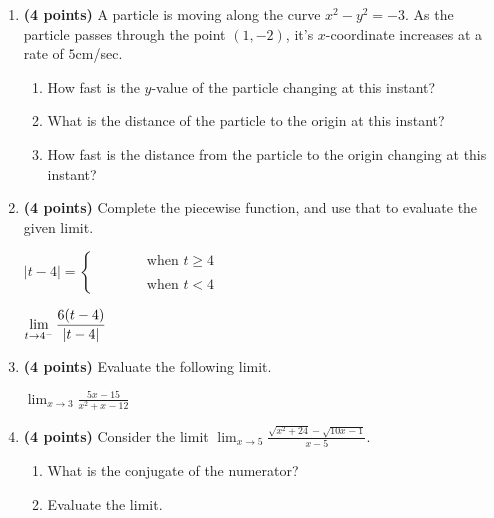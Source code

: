 \documentclass[12pt]{amsart}
\begin{document}
\begin{enumerate}
\vspace{2cm}
\newpage\def \b{1}\def \x{1}\def \y{-2}\def \xchange{5}\def \ratrhs{-2}\def \cirrhs{5}\def \hyprhs{-3}\def \compy{y^{2}}\def \ychangenum{-10}\def \dist{5}\def \fracrat{-30}\def \fraccirc{0}\def \frachyp{20}
\item {\bf (4 points)} 
 A particle is moving along the curve $x^2 - \compy = \hyprhs$. As the particle passes through the point $(\x,\y)$, it's $x$-coordinate increases at a rate of $\xchange$cm/sec. \begin{enumerate}
\item How fast is the $y$-value of the particle changing at this instant? \vfill
\item What is the distance of the particle to the origin at this instant? \vfill
\item How fast is the distance from the particle to the origin changing at this instant? \vfill
\end{enumerate}

\newpage\def \a{4}\def \k{6}\def \abstop{0}\def \ktop{1}
\item {\bf (4 points)} 
 Complete the piecewise function, and use that to evaluate the given limit.

\vspace{.5cm}

$|t- \a| = \begin{cases} \hspace{1cm} & \text{ when } t \geq \a \\ & \\ \hspace{1cm} & \text{ when } t < \a \end{cases}$

\vspace{.5cm}

$\displaystyle \lim_{t \rightarrow \a^-} \frac{\ifthenelse{\ktop=1}{\k}{}\ifthenelse{\abstop=1}{|t-\a|}{(t-\a)}}{\ifthenelse{\ktop=0}{\k}{}\ifthenelse{\abstop=0}{|t-\a|}{(t-\a)}}$

\vfill 
\def \a{3}\def \b{-4}\def \k{5}\def \fancyp{x^{2}+x^{}-12}\def \simplep{5x^{}-15}\def \fancyreduced{7}\def \niceanstop{\frac{7}{5}}\def \niceansbottom{\frac{5}{7}}
\item {\bf (4 points)} 
 Evaluate the following limit. 

$\displaystyle \lim_{x\rightarrow \a} \frac{\simplep}{\fancyp}$

\vfill 
\newpage\def \a{5}\def \b{5}\def \ab{25}\def \c{24}\def \amb{0}\def \ansroot{49}\def \firstroot{x^{2}+24}\def \secondroot{10x^{}-1}\def \porm{1}
\item {\bf (4 points)} 
 Consider the limit $\displaystyle \lim_{x \rightarrow \a} \frac{\sqrt{\firstroot} - \sqrt{\secondroot}}{x-\a}$. \begin{enumerate}
\item What is the conjugate of the numerator? \vspace{3cm}
\item Evaluate the limit.
\end{enumerate}


\end{enumerate}
\end{document}
